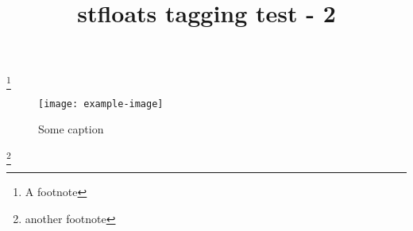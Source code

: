 \documentclass{article}
\title{stfloats tagging test - 2}
\begin{document}
\kant[1]\footnote{A footnote}
\begin{figure}[b]
\centering
\texttt{[image: example-image]}
\caption{Some caption}
\end{figure}
\kant[2]\footnote{another footnote}
\kant[3-4]
\end{document}
